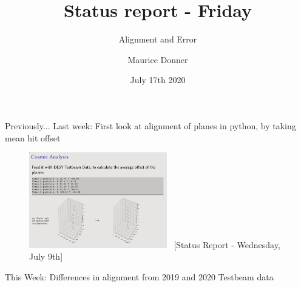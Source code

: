\documentclass{beamer}
\title{\texorpdfstring{\color{blue!50!black}\textbf{Status report - Friday }}{}}
\subtitle{Alignment and Error}
\author{Maurice Donner}
\date{July 17th 2020}
\begin{document}
\maketitle

\begin{frame}{Previously...}
Last week: First look at alignment of planes in python, by taking mean hit offset\\
\begin{figure}[H]
    \centering
    \includegraphics[width=6cm]{Last_Week.png}
    \tiny \ [Status Report - Wednesday, July 9th]
\end{figure}
\pause
This Week: Differences in alignment from 2019 and 2020 Testbeam data
\end{frame}
\end{document}
